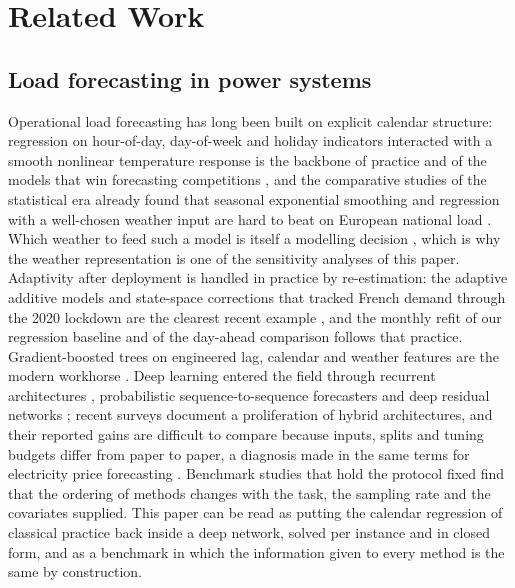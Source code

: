 \section{Related Work}

\subsection{Load forecasting in power systems}
Operational load forecasting has long been built on explicit calendar structure: regression on
hour-of-day, day-of-week and holiday indicators interacted with a smooth nonlinear temperature
response is the backbone of practice and of the models that win forecasting competitions
\cite{hong2016gefcom,hong2016tutorial,wang2016recency,hong2019gefcom2017}, and the
comparative studies of the statistical era already found that seasonal exponential smoothing
and regression with a well-chosen weather input are hard to beat on European national load
\cite{taylor2007stlf}. Which weather to feed such a model is itself a modelling decision
\cite{hong2015weather}, which is why the weather representation is one of the sensitivity
analyses of this paper. Adaptivity after deployment is handled in practice by re-estimation:
the adaptive additive models and state-space corrections that tracked French demand through
the 2020 lockdown are the clearest recent example \cite{obst2021covid}, and the monthly refit
of our regression baseline and of the day-ahead comparison follows that practice.
Gradient-boosted trees on engineered lag, calendar and weather features are the modern
workhorse \cite{friedman2001gbm}. Deep learning entered the field through recurrent
architectures \cite{kong2019lstm}, probabilistic sequence-to-sequence forecasters
\cite{salinas2020deepar,wen2017mqrnn} and deep residual networks \cite{chen2019resnet}; recent
surveys \cite{hong2020review,eaai2025survey,haben2021lv} document a proliferation of hybrid
architectures, and their reported gains are difficult to compare because inputs, splits and
tuning budgets differ from paper to paper, a diagnosis made in the same terms for electricity
price forecasting \cite{lago2021epf}. Benchmark studies that hold the protocol fixed
\cite{fets2026,household2026} find that the ordering of methods changes with the task, the
sampling rate and the covariates supplied. This paper can be read as putting the calendar
regression of classical practice back inside a deep network, solved per instance and in closed
form, and as a benchmark in which the information given to every method is the same by
construction.

